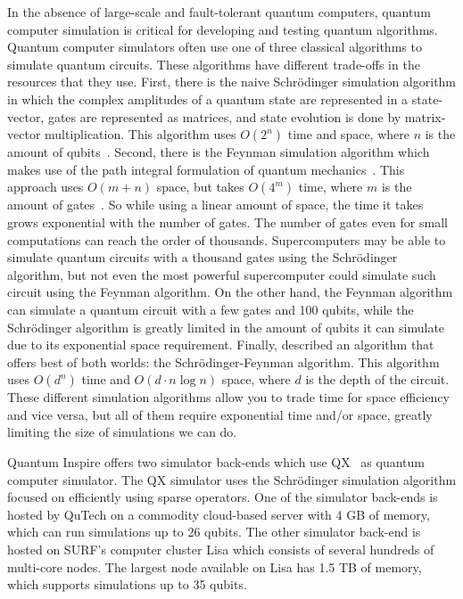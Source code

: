 In the absence of large-scale and fault-tolerant quantum computers, quantum computer simulation is critical for developing and testing quantum algorithms.
Quantum computer simulators often use one of three classical algorithms to simulate quantum circuits.
These algorithms have different trade-offs in the resources that they use.
First, there is the naive Schr{\"o}dinger simulation algorithm in which the complex amplitudes of a quantum state are represented in a state-vector, gates are represented as matrices, and state evolution is done by matrix-vector multiplication.
This algorithm uses $O(2^n)$ time and space, where $n$ is the amount of qubits~\cite{aaronson2016complexity}.
Second, there is the Feynman simulation algorithm which makes use of the path integral formulation of quantum mechanics~\cite{feynman2005space}.
This approach uses $O(m+n)$ space, but takes $O(4^m)$ time, where $m$ is the amount of gates~\cite{aaronson2016complexity}.
So while using a linear amount of space, the time it takes grows exponential with the number of gates.
The number of gates even for small computations can reach the order of thousands.
Supercomputers may be able to simulate quantum circuits with a thousand gates using the Schr{\"o}dinger  algorithm, but not even the most powerful supercomputer could simulate such circuit using the Feynman algorithm.
On the other hand, the Feynman algorithm can simulate a quantum circuit with a few gates and 100 qubits, while the Schr{\"o}dinger algorithm is greatly limited in the amount of qubits it can simulate due to its exponential space requirement.
Finally, \textcite{aaronson2016complexity} described an algorithm that offers best of both worlds: the Schr{\"o}dinger-Feynman algorithm.
This algorithm uses $O(d^n)$ time and $O(d \cdot n \log n)$ space, where $d$ is the depth of the circuit.
These different simulation algorithms allow you to trade time for space efficiency and vice versa, but all of them require exponential time and/or space, greatly limiting the size of simulations we can do.

Quantum Inspire offers two simulator back-ends which use QX~\cite{khammassi2017qx} as quantum computer simulator.
The QX simulator uses the Schr{\"o}dinger simulation algorithm focused on efficiently using sparse operators.
One of the simulator back-ends is hosted by QuTech on a commodity cloud-based server with 4 GB of memory, which can run simulations up to 26 qubits.
The other simulator back-end is hosted on SURF's computer cluster Lisa which consists of several hundreds of multi-core nodes.
The largest node available on Lisa has 1.5 TB of memory, which supports simulations up to 35 qubits.

